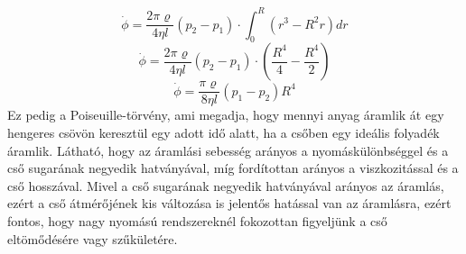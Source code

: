 \documentclass[../main.tex]{subfiles}
\begin{document}
\begin{equation}
    \dot{\phi} = \frac{2\pi\varrho}{4 \eta l} (p_2 - p_1) \cdot \int_0^R (r^3 - R^2 r) dr
\end{equation}
\begin{equation}
    \dot{\phi} = \frac{2\pi\varrho}{4 \eta l} (p_2 - p_1) \cdot \left(\frac{R^4}{4} - \frac{R^4}{2}\right)
\end{equation}
\begin{equation}
    \dot{\phi} = \frac{\pi \varrho}{8 \eta l} (p_1 - p_2) R^4
\end{equation}
Ez pedig a Poiseuille-törvény, ami megadja, hogy mennyi anyag áramlik át egy hengeres csövön keresztül egy adott idő alatt, ha a csőben egy ideális folyadék áramlik.
Látható, hogy az áramlási sebesség arányos a nyomáskülönbséggel és a cső sugarának negyedik hatványával, míg fordítottan arányos a viszkozitással és a cső hosszával.
Mivel a cső sugarának negyedik hatványával arányos az áramlás, ezért a cső átmérőjének kis változása is jelentős hatással van az áramlásra, ezért fontos, hogy
nagy nyomású rendszereknél fokozottan figyeljünk a cső eltömődésére vagy szűkületére.
\end{document}
